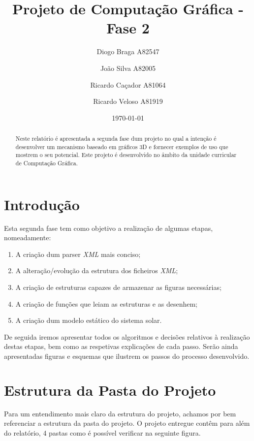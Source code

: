 \documentclass[a4paper]{article}
\title{Projeto de Computação Gráfica - Fase 2}
\author{Diogo Braga A82547 \and João Silva A82005 \and Ricardo Caçador A81064
\and Ricardo Veloso A81919}
\date{\today}
\begin{document}
\maketitle

\begin{abstract}
Neste relatório é apresentada a segunda fase dum projeto no qual a intenção é desenvolver um mecanismo baseado em gráficos 3D e fornecer exemplos de uso que mostrem o seu potencial. Este projeto é desenvolvido no âmbito da unidade curricular de Computação Gráfica.
\end{abstract}


\newpage

\tableofcontents


\newpage

\section{Introdução}
\label{sec:intro}

Esta segunda fase tem como objetivo a realização de algumas etapas, nomeadamente:
\begin{enumerate}
\item A criação dum parser \emph{XML} mais conciso;
\item A alteração/evolução da estrutura dos ficheiros \emph{XML};
\item A criação de estruturas capazes de armazenar as figuras necessárias;
\item A criação de funções que leiam as estruturas e as desenhem;
\item A criação dum modelo estático do sistema solar.
\end{enumerate}

De seguida iremos apresentar todos os algoritmos e decisões relativos à realização destas etapas, bem como as respetivas explicações de cada passo.
Serão ainda apresentadas figuras e esquemas que ilustrem os passos do processo desenvolvido.



\section{Estrutura da Pasta do Projeto}
\label{sec:estrutura}

Para um entendimento mais claro da estrutura do projeto, achamos por bem referenciar a estrutura da pasta do projeto.
O projeto entregue contêm para além do relatório, 4 pastas como é possível verificar na seguinte figura.
\end{document}
